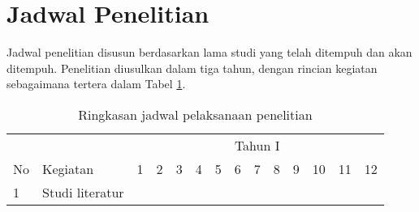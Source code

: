 \section[Jadwal Penelitian]{Jadwal Penelitian}
\begin{spacing}{1.5}
	Jadwal penelitian disusun berdasarkan lama studi yang telah ditempuh dan akan ditempuh. Penelitian diusulkan dalam tiga tahun, dengan rincian kegiatan sebagaimana tertera dalam Tabel \ref{tab:jad-pen}.
\begin{table}[htp]
	\caption{Ringkasan jadwal pelaksanaan penelitian}
	\centering
	\label{tab:jad-pen}
	\begin{tabular}{|l|l|llllllllllll|}
		\hline
		\multicolumn{1}{|c|}{}                     &                                                                                      & \multicolumn{12}{c|}{Tahun I}                                                                                                                                                                                                                                                                                                                                                                                                                                                                                                                                            \\ \cline{3-14} 
		\multicolumn{1}{|c|}{\multirow{-2}{*}{No}} & \multirow{-2}{*}{Kegiatan}                                                           & \multicolumn{1}{c|}{1}                        & \multicolumn{1}{c|}{2}                        & \multicolumn{1}{c|}{3}                        & \multicolumn{1}{c|}{4}                        & \multicolumn{1}{c|}{5}                        & \multicolumn{1}{c|}{6}                        & \multicolumn{1}{c|}{7}                        & \multicolumn{1}{c|}{8}                        & \multicolumn{1}{c|}{9}                        & \multicolumn{1}{c|}{10}                       & \multicolumn{1}{c|}{11}                       & \multicolumn{1}{c|}{12}  \\ \hline
		1                                          & Studi literatur                                                                      & \multicolumn{1}{l|}{\cellcolor[HTML]{343434}} & \multicolumn{1}{l|}{\cellcolor[HTML]{343434}} & \multicolumn{1}{l|}{\cellcolor[HTML]{343434}} & \multicolumn{1}{l|}{\cellcolor[HTML]{343434}} & \multicolumn{1}{l|}{}                         & \multicolumn{1}{l|}{}                         & \multicolumn{1}{l|}{}                         & \multicolumn{1}{l|}{}                         & \multicolumn{1}{l|}{}                         & \multicolumn{1}{l|}{}                         & \multicolumn{1}{l|}{}                         &                          \\ \hline

\end{tabular}
\end{table}
\end{spacing}

